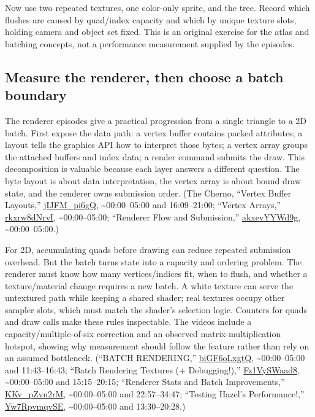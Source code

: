 Now use two repeated textures, one color-only sprite, and the tree. Record which flushes are caused by quad/index capacity and which by unique texture slots, holding camera and object set fixed. This is an original exercise for the atlas and batching concepts, not a performance measurement supplied by the episodes.

\subsection{Measure the renderer, then choose a batch boundary}\label{06-engine-ii-ch026-measure-the-renderer-then-choose-a-batch-boundary}

\hypertarget{06-engine-ii-ch026-measure-the-renderer-then-choose-a-batch-boundary}{}

The renderer episodes give a practical progression from a single triangle to a 2D batch. First expose the data path: a vertex buffer contains packed attributes; a layout tells the graphics API how to interpret those bytes; a vertex array groups the attached buffers and index data; a render command submits the draw. This decomposition is valuable because each layer answers a different question. The byte layout is about data interpretation, the vertex array is about bound draw state, and the renderer owns submission order. (The Cherno, ``Vertex Buffer Layouts,'' \href{https://www.youtube.com/watch?v=jIJFM_pi6gQ}{jIJFM\_pi6gQ}, \textasciitilde00:00--05:00 and 16:09--21:00; ``Vertex Arrays,'' \href{https://www.youtube.com/watch?v=rkxrw8dNrvI}{rkxrw8dNrvI}, \textasciitilde00:00--05:00; ``Renderer Flow and Submission,'' \href{https://www.youtube.com/watch?v=akxevYYWd9g}{akxevYYWd9g}, \textasciitilde00:00--05:00.)

For 2D, accumulating quads before drawing can reduce repeated submission overhead. But the batch turns state into a capacity and ordering problem. The renderer must know how many vertices/indices fit, when to flush, and whether a texture/material change requires a new batch. A white texture can serve the untextured path while keeping a shared shader; real textures occupy other sampler slots, which must match the shader's selection logic. Counters for quads and draw calls make these rules inspectable. The videos include a capacity/multiple-of-six correction and an observed matrix-multiplication hotspot, showing why measurement should follow the feature rather than rely on an assumed bottleneck. (``BATCH RENDERING,'' \href{https://www.youtube.com/watch?v=biGF6oLxgtQ}{biGF6oLxgtQ}, \textasciitilde00:00--05:00 and 11:43--16:43; ``Batch Rendering Textures (+ Debugging!),'' \href{https://www.youtube.com/watch?v=Fz1VySWaad8}{Fz1VySWaad8}, \textasciitilde00:00--05:00 and 15:15--20:15; ``Renderer Stats and Batch Improvements,'' \href{https://www.youtube.com/watch?v=KKv_pZvn2rM}{KKv\_pZvn2rM}, \textasciitilde00:00--05:00 and 22:57--34:47; ``Testing Hazel's Performance!,'' \href{https://www.youtube.com/watch?v=Yw7RpvmqvSE}{Yw7RpvmqvSE}, \textasciitilde00:00--05:00 and 13:30--20:28.)

